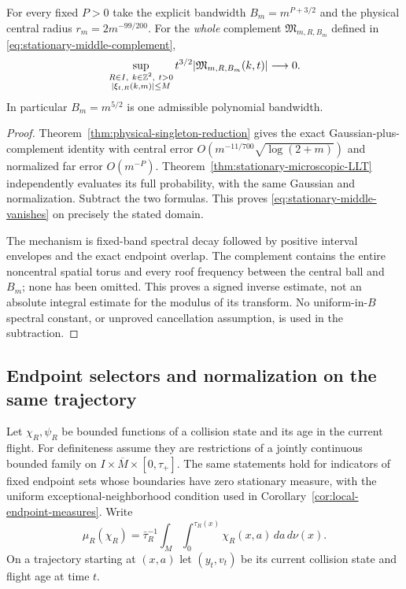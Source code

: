 \begin{corollary}
\label{cor:stationary-middle-vanishes}
For every fixed $P>0$ take the explicit bandwidth $B_m=m^{P+3/2}$
and the physical central radius $r_m=2m^{-99/200}$. For the \emph{whole}
complement $\mathfrak M_{m,R,B_m}$ defined in
\eqref{eq:stationary-middle-complement},
\begin{equation}\label{eq:stationary-middle-vanishes}
 \sup_{\substack{R\in I,\ k\in\Z^2,\ t>0\\
                         |\xi_{t,R}(k,m)|\le M}}
 t^{3/2}|\mathfrak M_{m,R,B_m}(k,t)|\longrightarrow0.
\end{equation}
In particular $B_m=m^{5/2}$ is one admissible polynomial bandwidth.
\end{corollary}
\begin{proof}
Theorem~\ref{thm:physical-singleton-reduction} gives the exact
Gaussian-plus-complement identity with central error
$O(m^{-11/700}\sqrt{\log(2+m)})$ and normalized far error $O(m^{-P})$.
Theorem~\ref{thm:stationary-microscopic-LLT} independently evaluates
its full probability, with the same Gaussian and normalization.
Subtract the two formulas. This proves
\eqref{eq:stationary-middle-vanishes} on precisely the stated domain.

The mechanism is fixed-band spectral decay followed by positive
interval envelopes and the exact endpoint overlap. The complement
contains the entire noncentral spatial torus and every roof frequency
between the central ball and $B_m$; none has been omitted. This proves
a signed inverse estimate, not an absolute integral estimate for the
modulus of its transform. No uniform-in-$B$ spectral constant, or
unproved cancellation assumption, is used in the subtraction.
\end{proof}

\subsection{Endpoint selectors and normalization on the same trajectory}
Let $\chi_R,\psi_R$ be bounded functions of a collision state and its
age in the current flight. For definiteness assume they are restrictions
of a jointly continuous bounded family on
$I\times\overline M\times[0,\tau_+]$. The same statements hold for
indicators of fixed endpoint sets whose boundaries have zero stationary
measure, with the uniform exceptional-neighborhood condition used in
Corollary~\ref{cor:local-endpoint-measures}. Write
\[
 \mu_R(\chi_R)=\bar\tau_R^{-1}\int_M\int_0^{\tau_R(x)}
                       \chi_R(x,a)\,da\,d\nu(x).
\]
On a trajectory starting at $(x,a)$ let $(y_t,v_t)$ be its current
collision state and flight age at time $t$.

